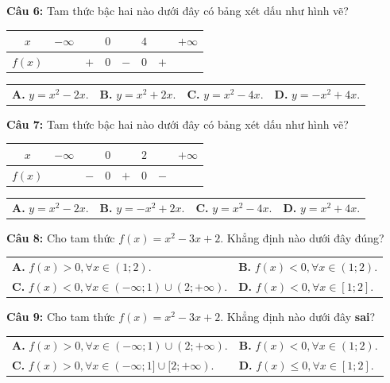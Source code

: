 \documentclass[12pt,a4paper]{extarticle}
\begin{document}
\noindent\textbf{Câu 6:} Tam thức bậc hai nào dưới đây có bảng xét dấu như hình vẽ?
\begin{center}
\begin{tabular}{|c|ccccccc|}
\hline
$x$ & $-\infty$ & & $0$ & & $4$ & & $+\infty$ \\
\hline
$f(x)$ & & $+$ & $0$ & $-$ & $0$ & $+$ & \\
\hline
\end{tabular}
\end{center}
\begin{center}
\begin{tabular}{p{3.5cm} p{3.5cm} p{3.5cm} p{3.5cm}}
\textbf{A.} $y=x^2-2x$. & \textbf{B.} $y=x^2+2x$. & \textbf{C.} $y=x^2-4x$. & \textbf{D.} $y=-x^2+4x$.
\end{tabular}
\end{center}
\noindent\textbf{Câu 7:} Tam thức bậc hai nào dưới đây có bảng xét dấu như hình vẽ?
\begin{center}
\begin{tabular}{|c|ccccccc|}
\hline
$x$ & $-\infty$ & & $0$ & & $2$ & & $+\infty$ \\
\hline
$f(x)$ & & $-$ & $0$ & $+$ & $0$ & $-$ & \\
\hline
\end{tabular}
\end{center}
\begin{center}
\begin{tabular}{p{3.5cm} p{3.5cm} p{3.5cm} p{3.5cm}}
\textbf{A.} $y=x^2-2x$. & \textbf{B.} $y=-x^2+2x$. & \textbf{C.} $y=x^2-4x$. & \textbf{D.} $y=x^2+4x$.
\end{tabular}
\end{center}
\noindent\textbf{Câu 8:} Cho tam thức $f(x)=x^2-3x+2$. Khẳng định nào dưới đây đúng?
\begin{center}
\begin{tabular}{p{7.5cm} p{7.5cm}}
\textbf{A.} $f(x)>0, \forall x \in (1;2)$. & \textbf{B.} $f(x)<0, \forall x \in (1;2)$. \\
\textbf{C.} $f(x)<0, \forall x \in (-\infty;1) \cup (2;+\infty)$. & \textbf{D.} $f(x)<0, \forall x \in [1;2]$.
\end{tabular}
\end{center}
\noindent\textbf{Câu 9:} Cho tam thức $f(x)=x^2-3x+2$. Khẳng định nào dưới đây \textbf{sai}?
\begin{center}
\begin{tabular}{p{7.5cm} p{7.5cm}}
\textbf{A.} $f(x)>0, \forall x \in (-\infty;1) \cup (2;+\infty)$. & \textbf{B.} $f(x)<0, \forall x \in (1;2)$. \\
\textbf{C.} $f(x)>0, \forall x \in (-\infty;1] \cup [2;+\infty)$. & \textbf{D.} $f(x) \leq 0, \forall x \in [1;2]$.
\end{tabular}
\end{center}
\end{document}
